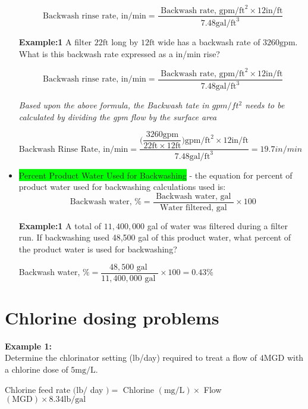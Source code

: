 \documentclass{article}
\begin{document}
\begin{itemize}
$$\text{ Backwash rinse rate, in/} \mathrm{min}=\frac{\text { Backwash rate, } \mathrm{gpm} / \mathrm{ft}^{2} \times 12 \mathrm{in} / \mathrm{ft}}{7.48 \mathrm{gal} / \mathrm{ft}^{3}}$$

\textbf{Example:1}
A filter $22 \mathrm{ft}$ long by $12 \mathrm{ft}$ wide has a backwash rate of $3260 \mathrm{gpm}$. What is this backwash rate expressed as a in/min rise?

$$\text{ Backwash rinse rate, in/} \mathrm{min}=\frac{\text { Backwash rate, } \mathrm{gpm} / \mathrm{ft}^{2} \times 12 \mathrm{in} / \mathrm{ft}}{7.48 \mathrm{gal} / \mathrm{ft}^{3}}$$

\textit{Based upon the above formula, the Backwash tate in $gpm/ft^2$ needs to be calculated by dividing the gpm flow by the surface area}

$\text{Backwash Rinse Rate, in/} \mathrm{min}=\dfrac{
\Biggl(\dfrac{3260 \mathrm{gpm}}{22 \mathrm{ft} \times 12 \mathrm{ft}}\Biggr) \mathrm{gpm} / \mathrm{ft}^{2} \times 12 \mathrm{in} / \mathrm{ft}
}
{
7.48 \mathrm{gal} / \mathrm{ft}^{3}
}=\boxed{19.7in/min}$


\item \colorbox{lime}{Percent Product Water Used for Backwashing} - the equation for percent of product water used for backwashing calculations used is:\\
$$
\text { Backwash water, } \%=\frac{\text { Backwash water, gal }}{\text { Water filtered, gal }} \times 100
$$

\textbf{Example:1}
A total of $11,400,000$ gal of water was filtered during a filter run. If backwashing used 48,500 gal of this product water, what percent of the product water is used for backwashing?

Backwash water, $\%=\dfrac{48,500 \text { gal }}{11,400,000 \text { gal }} \times 100 = \boxed{0.43 \%}$

\end{itemize}


\section{Chlorine dosing problems}
\textbf{Example 1:}\\
Determine the chlorinator setting (lb/day) required to treat a flow of $4 \mathrm{MGD}$ with a chlorine dose of $5 \mathrm{mg} / \mathrm{L}$.

Chlorine feed rate $(\mathrm{lb} /$ day $)=$ Chlorine $(\mathrm{mg} / \mathrm{L}) \times$ Flow $(\mathrm{MGD}) \times 8.34 \mathrm{lb} / \mathrm{gal}$
\end{document}
